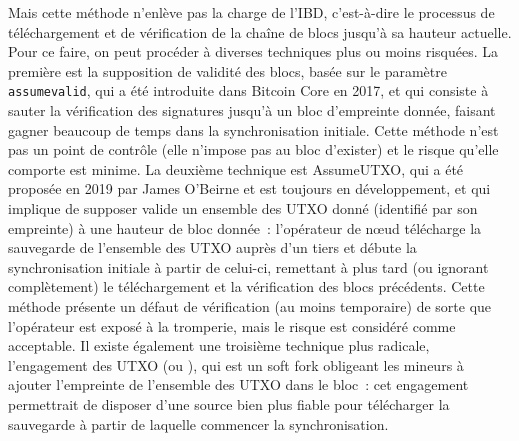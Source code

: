 Mais cette méthode n'enlève pas la charge de l'IBD, c'est-à-dire le processus de téléchargement et de vérification de la chaîne de blocs jusqu'à sa hauteur actuelle. Pour ce faire, on peut procéder à diverses techniques plus ou moins risquées. La première est la supposition de validité des blocs, basée sur le paramètre \texttt{assumevalid}, qui a été introduite dans Bitcoin Core en 2017, et qui consiste à sauter la vérification des signatures jusqu'à un bloc d'empreinte donnée, faisant gagner beaucoup de temps dans la synchronisation initiale. Cette méthode n'est pas un point de contrôle (elle n'impose pas au bloc d'exister) et le risque qu'elle comporte est minime. La deuxième technique est AssumeUTXO, qui a été proposée en 2019 par James O'Beirne et est toujours en développement, et qui implique de supposer valide un ensemble des UTXO donné (identifié par son empreinte) à une hauteur de bloc donnée~: l'opérateur de nœud télécharge la sauvegarde de l'ensemble des UTXO auprès d'un tiers et débute la synchronisation initiale à partir de celui-ci, remettant à plus tard (ou ignorant complètement) le téléchargement et la vérification des blocs précédents. Cette méthode présente un défaut de vérification (au moins temporaire) de sorte que l'opérateur est exposé à la tromperie, mais le risque est considéré comme acceptable. Il existe également une troisième technique plus radicale, l'engagement des UTXO (ou ), qui est un soft fork obligeant les mineurs à ajouter l'empreinte de l'ensemble des UTXO dans le bloc~: cet engagement permettrait de disposer d'une source bien plus fiable pour télécharger la sauvegarde à partir de laquelle commencer la synchronisation.

